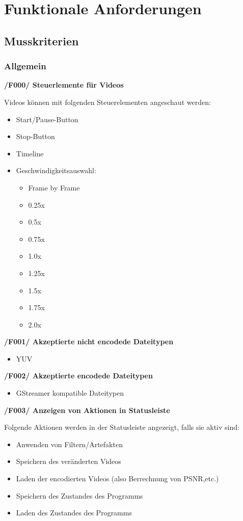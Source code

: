 \documentclass[parskip=full]{scrartcl}
\begin{document}
\section{Funktionale Anforderungen}
\subsection{Musskriterien}
\subsubsection{Allgemein}
\textbf{/F000/ Steuerlemente für Videos}

Videos können mit folgenden Steuerelementen angeschaut werden:
\begin{itemize}
\item Start/Pause-Button
\item Stop-Button
\item Timeline
\item Geschwindigkeitsauswahl:
\begin{itemize}
\item Frame by Frame
\item 0.25x
\item 0.5x
\item 0.75x
\item 1.0x
\item 1.25x
\item 1.5x
\item 1.75x
\item 2.0x
\end{itemize}
\end{itemize}

\textbf{/F001/ Akzeptierte nicht encodede Dateitypen}

\begin{itemize}
\item YUV
\end{itemize}
\newpage
\textbf{/F002/ Akzeptierte encodede Dateitypen}
\begin{itemize}
\item GStreamer kompatible Dateitypen
\end{itemize}

\textbf{/F003/ Anzeigen von Aktionen in Statusleiste}

Folgende Aktionen werden in der Statusleiste angezeigt, falls sie aktiv sind:
\begin{itemize}
\item Anwenden von Filtern/Artefakten
\item Speichern des veränderten Videos
\item Laden der encodierten Videos (also Berrechnung von PSNR,etc.)
\item Speichern des Zustandes des Programms
\item Laden des Zustandes des Programms
\end{itemize}
\end{document}
